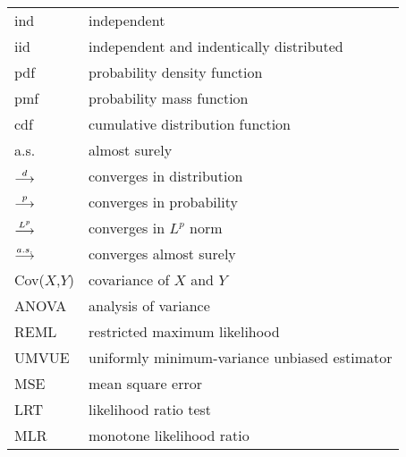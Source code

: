 \documentclass{article}
\begin{document}
\begin{tabular}{ll}
ind & independent \\
iid & independent and indentically distributed \\
pdf & probability density function \\
pmf & probability mass function \\
cdf & cumulative distribution function \\
a.s. & almost surely \\
\hline
$\stackrel{d}{\longrightarrow}$ & converges in distribution \\
$\stackrel{p}{\longrightarrow}$ & converges in probability \\
$\stackrel{L^p}{\longrightarrow}$ & converges in $L^p$ norm \\
$\stackrel{a.s.}{\longrightarrow}$ & converges almost surely \\
\hline
Cov($X$,$Y$) & covariance of $X$ and $Y$ \\
\hline
ANOVA & analysis of variance \\
REML & restricted maximum likelihood \\
UMVUE & uniformly minimum-variance unbiased estimator \\
MSE & mean square error \\
LRT & likelihood ratio test \\
MLR & monotone likelihood ratio \\
\end{tabular}
\end{document}

